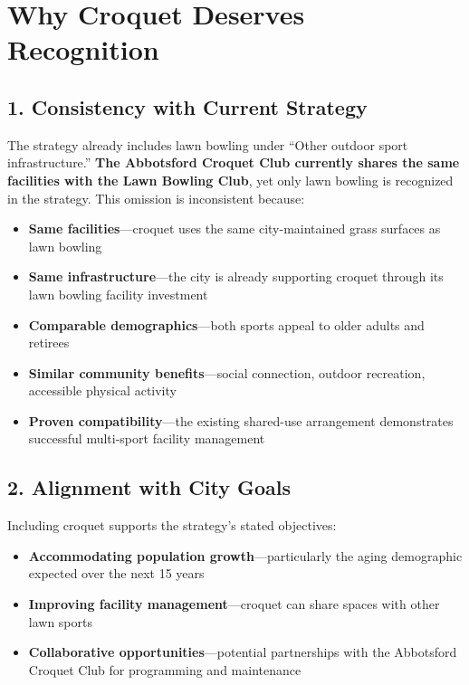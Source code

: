 \documentclass[11pt,letterpaper]{article}
\begin{document}
\section*{Why Croquet Deserves Recognition}

\subsection*{1. Consistency with Current Strategy}
The strategy already includes lawn bowling under ``Other outdoor sport infrastructure.'' \textbf{The Abbotsford Croquet Club currently shares the same facilities with the Lawn Bowling Club}, yet only lawn bowling is recognized in the strategy. This omission is inconsistent because:

\begin{itemize}[leftmargin=*]
    \item \textbf{Same facilities}---croquet uses the same city-maintained grass surfaces as lawn bowling
    \item \textbf{Same infrastructure}---the city is already supporting croquet through its lawn bowling facility investment
    \item \textbf{Comparable demographics}---both sports appeal to older adults and retirees
    \item \textbf{Similar community benefits}---social connection, outdoor recreation, accessible physical activity
    \item \textbf{Proven compatibility}---the existing shared-use arrangement demonstrates successful multi-sport facility management
\end{itemize}

\subsection*{2. Alignment with City Goals}
Including croquet supports the strategy's stated objectives:
\begin{itemize}[leftmargin=*]
    \item \textbf{Accommodating population growth}---particularly the aging demographic expected over the next 15 years
    \item \textbf{Improving facility management}---croquet can share spaces with other lawn sports
    \item \textbf{Collaborative opportunities}---potential partnerships with the Abbotsford Croquet Club for programming and maintenance
\end{itemize}
\end{document}
